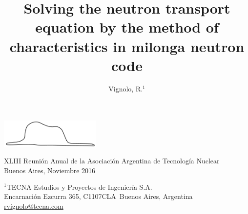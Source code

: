 \documentclass[11pt]{article}
\makeatletter
\numberwithin{equation}{section}
\def\affiliation#1{\def\@affiliation{#1}}
\def\maketitle{%
\thispagestyle{empty}

\null
\vspace{0.5cm plus 0.5cm minus 0.5cm}

\begin{center}
\begin{minipage}{0.8\linewidth}
\begin{center}
\Large{\textbf{\textsc{\@title}}}

\vspace{0.75cm plus 0.2cm minus 0.1cm}

\large{\@author}

\vspace{1.25cm plus 0.25cm minus 0.25cm}

\small{\@affiliation}
\vspace{1cm plus 0.2cm minus 0.2cm}

\end{center}
\end{minipage}
\end{center}

}
\makeatother
\begin{document}
\vfill

\begin{center}
\includegraphics[width=5cm]{vibora-blanca-sola.pdf}
\end{center}

\vfill

\begin{center}
\begin{small}
XLIII Reunión Anual de la Asociación Argentina de Tecnología Nuclear\\
Buenos Aires, Noviembre 2016
\end{small}
\end{center}

\pagebreak

\title{Solving the neutron transport equation by the method of characteristics in milonga neutron code}
\author{Vignolo, R.$^{1}$}
\affiliation{%
$^1$TECNA Estudios y Proyectos de Ingeniería S.A.\\
Encarnaci\'on Ezcurra 365, C1107CLA~Buenos Aires, Argentina\\
\url{rvignolo@tecna.com}\\
}


\maketitle
\end{document}

